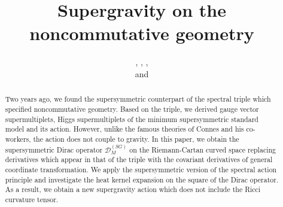 \documentclass{ptephy}%
\begin{document}
\title{Supergravity on the noncommutative geometry}

\author{, , 
, \\ and  
}

\address{
 \\
}

\begin{abstract}%
Two years ago, we found the supersymmetric counterpart of the spectral triple which specified noncommutative 
geometry. Based on the triple, we derived gauge vector supermultiplets, Higgs supermultiplets of the minimum 
supersymmetric standard model and its action. However, unlike the famous theories of Connes and his co-workers, 
the action does not couple to gravity. In this paper, we obtain the supersymmetric Dirac operator 
$\mathcal{D}_M^{(SG)}$  on the Riemann-Cartan curved space replacing derivatives which appear in that 
of the triple with the covariant derivatives of general coordinate transformation. We apply the supersymmetric 
version of the spectral action principle and investigate  
the heat kernel expansion on the square of the Dirac operator. As a result, we obtain a new supergravity 
action which does not include the Ricci curvature tensor. 
\end{abstract}
\maketitle
\end{document}
